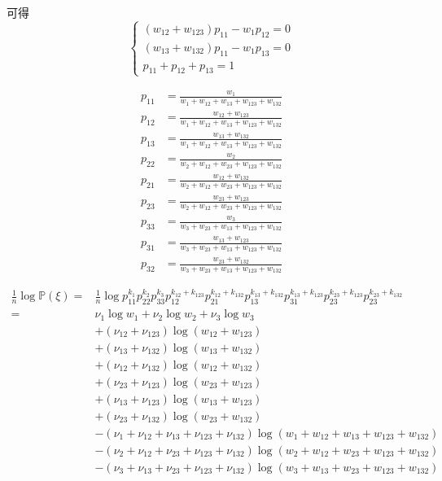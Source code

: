\documentclass[cn,hazy,egreen,14pt,normal]{elegantnote}
\begin{document}
可得
\begin{equation*}
    \left\{
        \begin{array}{l}
            (w_{12}+w_{123})p_{11} - w_1 p_{12} = 0 \\
            (w_{13}+w_{132})p_{11} - w_1 p_{13} = 0 \\
            p_{11} + p_{12} + p_{13} = 1
        \end{array}
    \right.
\end{equation*}

\begin{align*}
    p_{11} &= \frac{w_{1}}{w_{1}+w_{12}+w_{13}+w_{123}+w_{132}} \\
    p_{12} &= \frac{w_{12} + w_{123}}{w_{1}+w_{12}+w_{13}+w_{123}+w_{132}}\\
    p_{13} &= \frac{w_{13} + w_{132}}{w_{1}+w_{12}+w_{13}+w_{123}+w_{132}}\\
    p_{22} &= \frac{w_{2}}{w_{2}+w_{12}+w_{23}+w_{123}+w_{132}} \\
    p_{21} &= \frac{w_{12} + w_{132}}{w_{2}+w_{12}+w_{23}+w_{123}+w_{132}}\\
    p_{23} &= \frac{w_{23} + w_{123}}{w_{2}+w_{12}+w_{23}+w_{123}+w_{132}}\\
    p_{33} &= \frac{w_{3}}{w_{3}+w_{23}+w_{13}+w_{123}+w_{132}} \\
    p_{31} &= \frac{w_{13} + w_{123}}{w_{3}+w_{23}+w_{13}+w_{123}+w_{132}}\\
    p_{32} &= \frac{w_{23} + w_{132}}{w_{3}+w_{23}+w_{13}+w_{123}+w_{132}}
\end{align*}

\begin{align*}
    \frac{1}{n} \log \mathbb{P}(\xi)
    =& \frac{1}{n} \log p_{11}^{k_1} p_{22}^{k_2} p_{33}^{k_3} p_{12}^{k_{12}+k_{123}} p_{21}^{k_{12}+k_{132}} p_{13}^{k_{13}+k_{132}} p_{31}^{k_{13}+k_{123}} p_{23}^{k_{23}+k_{123}} p_{23}^{k_{23}+k_{132}} \\
    =& \nu_{1} \log w_{1} + \nu_{2} \log w_{2} + \nu_{3} \log w_{3} \\
    &+ (\nu_{12} + \nu_{123}) \log(w_{12} + w_{123}) \\
    &+ (\nu_{13} + \nu_{132}) \log(w_{13} + w_{132}) \\
    &+ (\nu_{12} + \nu_{132}) \log(w_{12} + w_{132}) \\
    &+ (\nu_{23} + \nu_{123}) \log(w_{23} + w_{123}) \\
    &+ (\nu_{13} + \nu_{123}) \log(w_{13} + w_{123}) \\
    &+ (\nu_{23} + \nu_{132}) \log(w_{23} + w_{132}) \\
    &- (\nu_1 + \nu_{12} + \nu_{13} + \nu_{123} + \nu_{132}) \log (w_1 + w_{12} + w_{13} + w_{123} + w_{132}) \\
    &- (\nu_2 + \nu_{12} + \nu_{23} + \nu_{123} + \nu_{132}) \log (w_2 + w_{12} + w_{23} + w_{123} + w_{132}) \\
    &- (\nu_3 + \nu_{13} + \nu_{23} + \nu_{123} + \nu_{132}) \log (w_3 + w_{13} + w_{23} + w_{123} + w_{132}) \\
\end{align*}
\end{document}

